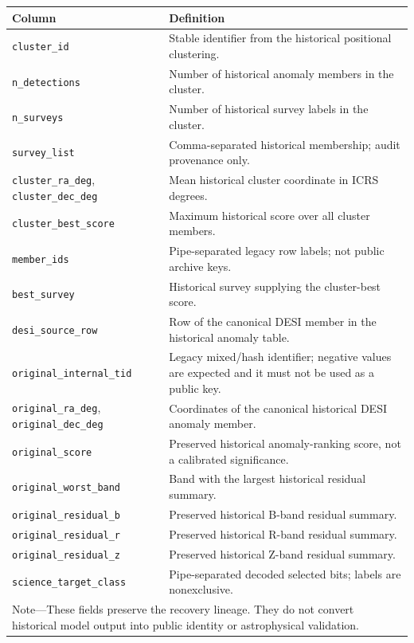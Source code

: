 \documentclass[twocolumn]{aastex701}
\begin{document}
\begin{center}
\smallskip
\scriptsize
\begin{tabular}{p{}p{}}
\toprule
Column & Definition \\
\midrule
\texttt{cluster\_id} & Stable identifier from the historical positional clustering. \\
\texttt{n\_detections} & Number of historical anomaly members in the cluster. \\
\texttt{n\_surveys} & Number of historical survey labels in the cluster. \\
\texttt{survey\_list} & Comma-separated historical membership; audit provenance only. \\
\texttt{cluster\_ra\_deg}, \texttt{cluster\_dec\_deg} & Mean historical cluster coordinate in ICRS degrees. \\
\texttt{cluster\_best\_score} & Maximum historical score over all cluster members. \\
\texttt{member\_ids} & Pipe-separated legacy row labels; not public archive keys. \\
\texttt{best\_survey} & Historical survey supplying the cluster-best score. \\
\texttt{desi\_source\_row} & Row of the canonical DESI member in the historical anomaly table. \\
\texttt{original\_internal\_tid} & Legacy mixed/hash identifier; negative values are expected and it must not be used as a public key. \\
\texttt{original\_ra\_deg}, \texttt{original\_dec\_deg} & Coordinates of the canonical historical DESI anomaly member. \\
\texttt{original\_score} & Preserved historical anomaly-ranking score, not a calibrated significance. \\
\texttt{original\_worst\_band} & Band with the largest historical residual summary. \\
\texttt{original\_residual\_b} & Preserved historical B-band residual summary. \\
\texttt{original\_residual\_r} & Preserved historical R-band residual summary. \\
\texttt{original\_residual\_z} & Preserved historical Z-band residual summary. \\
\texttt{science\_target\_class} & Pipe-separated decoded selected bits; labels are nonexclusive. \\
\bottomrule
\multicolumn{2}{p{0.93\textwidth}}{\footnotesize Note---These fields preserve the recovery
lineage. They do not convert historical model output into public identity or astrophysical
validation.}\\
\end{tabular}
\end{center}
\end{document}
